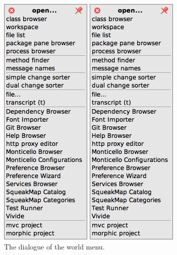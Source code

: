 \documentclass[a4paper,10pt,twoside]{book}
\begin{document}
\begin{figure}[htb]
\ifluluelse
	{\centerline {\includegraphics[scale=0.4]{OpenMenu}}}
	{\centerline {\includegraphics[scale=0.7]{OpenMenu}}}
\caption{The  dialogue of the world menu.\label{fig:openmenu}}
\end{figure}
\end{document}
